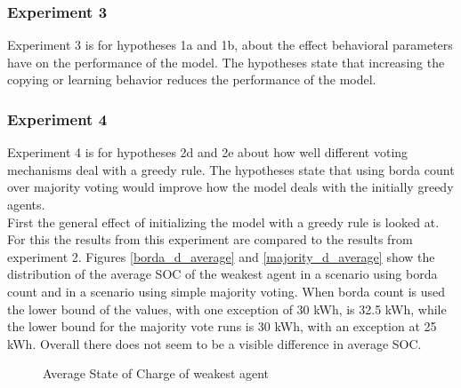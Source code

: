 \documentclass[a4paper]{article}
\begin{document}
\subsubsection{Experiment 3}
Experiment 3 is for hypotheses 1a and 1b, about the effect behavioral parameters have on the performance of the model. 
The hypotheses state that increasing the copying or learning behavior reduces the performance of the model.
\subsubsection{Experiment 4}
Experiment 4 is for hypotheses 2d and 2e about how well different voting mechanisms  deal with a greedy rule. The hypotheses state 
that using borda count over majority voting would improve how the model deals with the initially greedy agents. \\
First the general effect of initializing the model with a greedy rule is looked at. For this the results from this 
experiment are compared to the results from experiment 2. 
Figures \ref{borda_d_average} and \ref{majority_d_average} show the distribution of the average SOC of the weakest agent
in a scenario using borda count and in a scenario using simple majority voting. When borda count is used the lower bound 
of the values, with one exception of 30 kWh, is 32.5 kWh, while the lower bound for the majority vote runs is 
30 kWh, with an exception at 25 kWh. Overall there does not seem to be a visible difference in average SOC. 
\begin{figure}[!ht]
\caption{Average State of Charge of weakest agent}
\label{d_average}
\end{figure}
\end{document}
